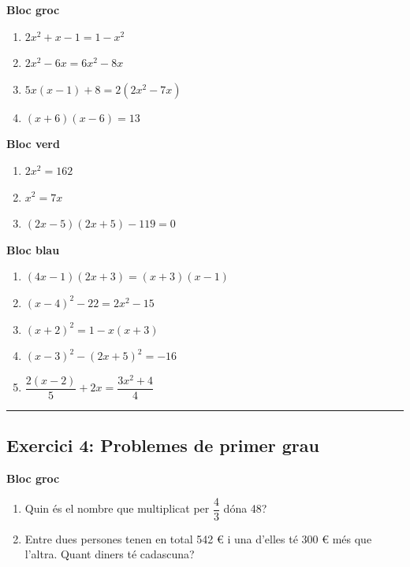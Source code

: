 \documentclass[11pt,a4paper]{article}
\begin{document}
\begin{blocgroc}
\textbf{Bloc groc}
\begin{enumerate}[label=\alph*), start=1]
\item $2x^2 + x - 1 = 1 - x^2$
\item $2x^2 - 6x = 6x^2 - 8x$
\item $5x(x - 1) + 8 = 2(2x^2 - 7x)$
\item $(x + 6)(x - 6) = 13$
\end{enumerate}
\end{blocgroc}

\begin{blocverd}
\textbf{Bloc verd}
\begin{enumerate}[label=\alph*), start=5]
\item $2x^2 = 162$
\item $x^2 = 7x$
\item $(2x - 5)(2x + 5) - 119 = 0$
\end{enumerate}
\end{blocverd}

\begin{blocblau}
\textbf{Bloc blau}
\begin{enumerate}[label=\alph*), start=8]
\item $(4x - 1)(2x + 3) = (x + 3)(x - 1)$
\item $(x - 4)^2 - 22 = 2x^2 - 15$
\item $(x + 2)^2 = 1 - x(x + 3)$
\item $(x - 3)^2 - (2x + 5)^2 = -16$
\item $\dfrac{2(x - 2)}{5} + 2x = \dfrac{3x^2 + 4}{4}$
\end{enumerate}
\end{blocblau}

\bigskip\hrule\bigskip

\subsection*{Exercici 4: Problemes de primer grau}

\begin{blocgroc}
\textbf{Bloc groc}
\begin{enumerate}[label=\alph*), start=1]
\item Quin és el nombre que multiplicat per $\dfrac{4}{3}$ dóna 48?
\item Entre dues persones tenen en total 542 € i una d’elles té 300 € més que l’altra. Quant diners té cadascuna?
\end{enumerate}
\end{blocgroc}
\end{document}
